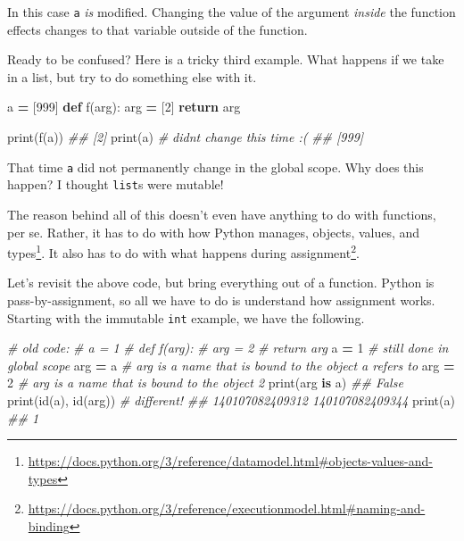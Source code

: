 \documentclass[
  12pt,
]{krantz}
\makeatletter
\newenvironment{Shaded}{\begin{snugshade}}{\end{snugshade}}
\newcommand{\BuiltInTok}[1]{#1}
\newcommand{\CommentTok}[1]{\textcolor[rgb]{0.37,0.37,0.37}{\textit{#1}}}
\newcommand{\ControlFlowTok}[1]{\textcolor[rgb]{0.27,0.27,0.27}{\textbf{#1}}}
\newcommand{\DecValTok}[1]{\textcolor[rgb]{0.06,0.06,0.06}{#1}}
\newcommand{\KeywordTok}[1]{\textcolor[rgb]{0.27,0.27,0.27}{\textbf{#1}}}
\newcommand{\NormalTok}[1]{#1}
\newcommand{\OperatorTok}[1]{\textcolor[rgb]{0.43,0.43,0.43}{\textbf{#1}}}
\renewcommand{\href}[2]{#2\footnote{\url{#1}}}
\newenvironment{kframe}{%
\medskip{}
\setlength{\fboxsep}{.8em}
 \def\at@end@of@kframe{}%
 \ifinner\ifhmode%
  \def\at@end@of@kframe{\end{minipage}}%
  \begin{minipage}{\columnwidth}%
 \fi\fi%
 \def\FrameCommand##1{\hskip\@totalleftmargin \hskip-\fboxsep
 \colorbox{shadecolor}{##1}\hskip-\fboxsep
     \hskip-\linewidth \hskip-\@totalleftmargin \hskip\columnwidth}%
 \MakeFramed {\advance\hsize-\width
   \@totalleftmargin\z@ \linewidth\hsize
   \@setminipage}}%
 {\par\unskip\endMakeFramed%
 \at@end@of@kframe}
\renewenvironment{Shaded}{\begin{kframe}}{\end{kframe}}
\makeatother
\begin{document}
In this case \texttt{a} \emph{is} modified. Changing the value of the argument \emph{inside} the function effects changes to that variable outside of the function.

Ready to be confused? Here is a tricky third example. What happens if we take in a list, but try to do something else with it.

\begin{Shaded}
\begin{Highlighting}[]
\NormalTok{a }\OperatorTok{=}\NormalTok{ [}\DecValTok{999}\NormalTok{]}
\KeywordTok{def}\NormalTok{ f(arg):}
\NormalTok{  arg }\OperatorTok{=}\NormalTok{ [}\DecValTok{2}\NormalTok{]}
  \ControlFlowTok{return}\NormalTok{ arg}

\BuiltInTok{print}\NormalTok{(f(a))}
\CommentTok{\#\# [2]}
\BuiltInTok{print}\NormalTok{(a) }\CommentTok{\# didn\textquotesingle{}t change this time :(}
\CommentTok{\#\# [999]}
\end{Highlighting}
\end{Shaded}

That time \texttt{a} did not permanently change in the global scope. Why does this happen? I thought \texttt{list}s were mutable!

The reason behind all of this doesn't even have anything to do with functions, per se. Rather, it has to do with how Python manages, \href{https://docs.python.org/3/reference/datamodel.html\#objects-values-and-types}{objects, values, and types}. It also has to do with what happens during \href{https://docs.python.org/3/reference/executionmodel.html\#naming-and-binding}{assignment}.

Let's revisit the above code, but bring everything out of a function. Python is pass-by-assignment, so all we have to do is understand how assignment works. Starting with the immutable \texttt{int} example, we have the following.

\begin{Shaded}
\begin{Highlighting}[]
\CommentTok{\# old code: }
\CommentTok{\# a = 1}
\CommentTok{\# def f(arg):}
\CommentTok{\#   arg = 2}
\CommentTok{\#   return arg}
\NormalTok{a }\OperatorTok{=} \DecValTok{1}    \CommentTok{\# still done in global scope}
\NormalTok{arg }\OperatorTok{=}\NormalTok{ a  }\CommentTok{\# arg is a name that is bound to the object a refers to}
\NormalTok{arg }\OperatorTok{=} \DecValTok{2}  \CommentTok{\# arg is a name that is bound to the object 2}
\BuiltInTok{print}\NormalTok{(arg }\KeywordTok{is}\NormalTok{ a)}
\CommentTok{\#\# False}
\BuiltInTok{print}\NormalTok{(}\BuiltInTok{id}\NormalTok{(a), }\BuiltInTok{id}\NormalTok{(arg)) }\CommentTok{\# different!\textasciigrave{}}
\CommentTok{\#\# 140107082409312 140107082409344}
\BuiltInTok{print}\NormalTok{(a)}
\CommentTok{\#\# 1}
\end{Highlighting}
\end{Shaded}
\end{document}
